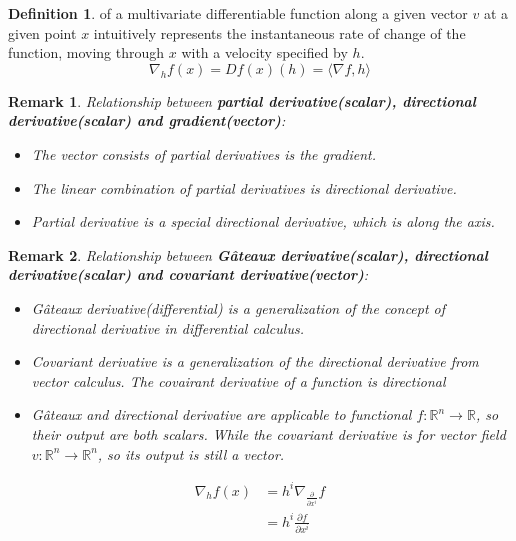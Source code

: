 \documentclass[a4paper]{article}
\theoremstyle{definition}
\newtheorem{definition}{Definition}
\theoremstyle{plain}
\newtheorem{remark}{Remark}
\begin{document}
\begin{definition}
 of a multivariate differentiable function along a given vector $v$ at a given point $x$ intuitively represents the instantaneous rate of change of the function, moving through $x$ with a velocity specified by $h$.
\begin{equation*}
    \nabla_hf(x)=Df(x)(h)=\langle\nabla f,h\rangle
\end{equation*}
\end{definition}

\begin{remark}
Relationship between \textbf{partial derivative(scalar), directional derivative(scalar) and gradient(vector)}:
\begin{itemize}
    \item The vector consists of partial derivatives is the gradient.
    \item The linear combination of partial derivatives is directional derivative.
    \item Partial derivative is a special directional derivative, which is along the axis.
\end{itemize}
\end{remark}

\begin{remark}
Relationship between \textbf{G\^ateaux derivative(scalar), directional derivative(scalar) and covariant derivative(vector)}:
\begin{itemize}
    \item G\^ateaux derivative(differential) is a generalization of the concept of directional derivative in differential calculus.
    \item Covariant derivative is a generalization of the directional derivative from vector calculus. The covairant derivative of a function is directional 
    \item G\^ateaux and directional derivative are applicable to functional $f:\mathbb{R}^n\rightarrow\mathbb{R}$, so their output are both scalars. While the covariant derivative is for vector field $v:\mathbb{R}^n\rightarrow\mathbb{R}^n$, so its output is still a vector.
\end{itemize}
\end{remark}

\begin{align*}
    \nabla_hf(x)&=h^i\nabla_{\frac{\partial}{\partial x^i}}f\\
    &=h^i\frac{\partial f}{\partial x^i}
\end{align*}
\end{document}

